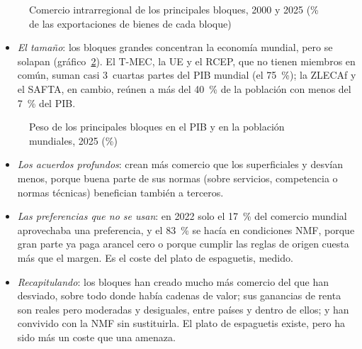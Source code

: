 \documentclass[11pt]{article}
\begin{document}
\begin{figure}[H]
\centering
\caption{Comercio intrarregional de los principales bloques, 2000 y 2025 (\% de las exportaciones de bienes de cada bloque)}\label{fig:intra}
\end{figure}

\begin{itemize}
\item \emph{El tamaño}: los bloques grandes concentran la economía mundial, pero se solapan (gráfico~\ref{fig:pib}). El T-MEC, la UE y el RCEP, que no tienen miembros en común, suman casi 3~cuartas partes del PIB mundial (el 75~\%); la ZLECAf y el SAFTA, en cambio, reúnen a más del 40~\% de la población con menos del 7~\% del PIB.
\end{itemize}

\begin{figure}[H]
\centering
\caption{Peso de los principales bloques en el PIB y en la población mundiales, 2025 (\%)}\label{fig:pib}
\end{figure}

\begin{itemize}
\item \emph{Los acuerdos profundos}: crean más comercio que los superficiales y desvían menos, porque buena parte de sus normas (sobre servicios, competencia o normas técnicas) benefician también a terceros\nocite{MattooMulabdicRuta2022}.
\item \emph{Las preferencias que no se usan}: en 2022 solo el 17~\% del comercio mundial aprovechaba una preferencia, y el 83~\% se hacía en condiciones NMF, porque gran parte ya paga arancel cero o porque cumplir las reglas de origen cuesta más que el margen\nocite{OMC2025PerfilesArancelarios}. Es el coste del plato de espaguetis, medido.
\item \emph{Recapitulando}: los bloques han creado mucho más comercio del que han desviado, sobre todo donde había cadenas de valor; sus ganancias de renta son reales pero moderadas y desiguales, entre países y dentro de ellos; y han convivido con la NMF sin sustituirla. El plato de espaguetis existe, pero ha sido más un coste que una amenaza.
\end{itemize}
\end{document}
